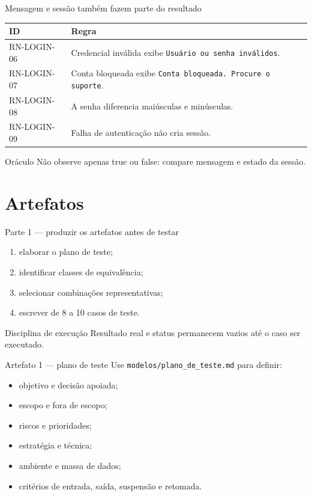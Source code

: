 \begin{frame}{Mensagem e sessão também fazem parte do resultado}
  \small
  \begin{tabular}{p{24mm}p{91mm}}
    \toprule
    \textbf{ID} & \textbf{Regra}\\
    \midrule
    RN-LOGIN-06 & Credencial inválida exibe
      \texttt{Usuário ou senha inválidos}.\\
    RN-LOGIN-07 & Conta bloqueada exibe
      \texttt{Conta bloqueada. Procure o suporte}.\\
    RN-LOGIN-08 & A senha diferencia maiúsculas e minúsculas.\\
    RN-LOGIN-09 & Falha de autenticação não cria sessão.\\
    \bottomrule
  \end{tabular}
  \vspace{5mm}

  \begin{block}{Oráculo}
    Não observe apenas true ou false: compare mensagem e estado da sessão.
  \end{block}
\end{frame}

\section{Artefatos}

\begin{frame}{Parte 1 — produzir os artefatos antes de testar}
  \begin{enumerate}
    \item elaborar o plano de teste;
    \item identificar classes de equivalência;
    \item selecionar combinações representativas;
    \item escrever de 8 a 10 casos de teste.
  \end{enumerate}
  \vspace{5mm}

  \begin{alertblock}{Disciplina de execução}
    Resultado real e status permanecem vazios até o caso ser executado.
  \end{alertblock}
\end{frame}

\begin{frame}{Artefato 1 — plano de teste}
  Use \texttt{modelos/plano\_de\_teste.md} para definir:
  \begin{itemize}
    \item objetivo e decisão apoiada;
    \item escopo e fora de escopo;
    \item riscos e prioridades;
    \item estratégia e técnica;
    \item ambiente e massa de dados;
    \item critérios de entrada, saída, suspensão e retomada.
  \end{itemize}
\end{frame}

